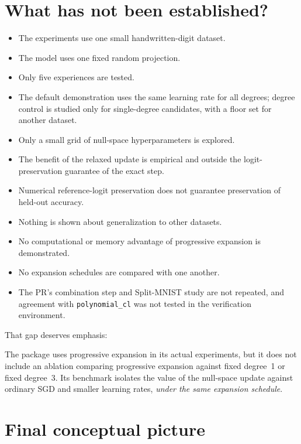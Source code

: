 \documentclass[11pt,a4paper]{article}
\newcommand{\code}[1]{\texttt{#1}}
\begin{document}
\section{What has not been established?}

\begin{itemize}
\item The experiments use one small handwritten-digit dataset.
\item The model uses one fixed random projection.
\item Only five experiences are tested.
\item The default demonstration uses the same learning rate for all degrees; degree control is studied only for single-degree candidates, with a floor set for another dataset.
\item Only a small grid of null-space hyperparameters is explored.
\item The benefit of the relaxed update is empirical and outside the logit-preservation guarantee of the exact step.
\item Numerical reference-logit preservation does not guarantee preservation of held-out accuracy.
\item Nothing is shown about generalization to other datasets.
\item No computational or memory advantage of progressive expansion is demonstrated.
\item No expansion schedules are compared with one another.
\item The PR's combination step and Split-MNIST study are not repeated, and agreement with \code{polynomial\_cl} was not tested in the verification environment.
\end{itemize}
That gap deserves emphasis:

\begin{keybox}[title={An important gap}]
The package uses progressive expansion in its actual experiments, but it does not include an ablation comparing progressive expansion against fixed degree~1 or fixed degree~3. Its benchmark isolates the value of the null-space update against ordinary SGD and smaller learning rates, \emph{under the same expansion schedule}.
\end{keybox}

\section{Final conceptual picture}\label{sec:final}
\end{document}
